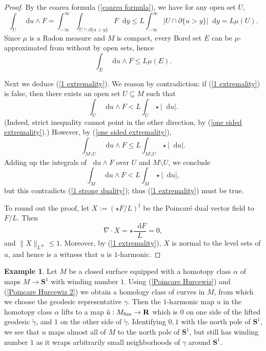 \documentclass[reqno,11pt]{amsart}
\newcommand{\RR}{\mathbf{R}}
\newcommand{\Sph}{\mathbf S}
\newcommand*\dif{\mathop{}\!\mathrm{d}}
\theoremstyle{definition}
\newtheorem{example}[theorem]{Example}
\numberwithin{equation}{section}
\begin{document}
\begin{proof}
By the coarea formula (\ref{coarea formula}), we have for any open set $U$,
$$\int_U \dif u \wedge F = \int_{-\infty}^\infty \int_{U \cap \partial \{u > y\}} F \dif y \leq L \int_{-\infty}^\infty |U \cap \partial \{u > y\}| \dif y = L \mu(U).$$
Since $\mu$ is a Radon measure and $M$ is compact, every Borel set $E$ can be $\mu$-approximated from without by open sets, hence
\begin{equation}\label{one sided extremality}
\int_E \dif u \wedge F \leq L \mu(E).
\end{equation}

Next we deduce (\ref{1 extremality}).
We reason by contradiction: if (\ref{1 extremality}) is false, then there exists an open set $U \subseteq M$ such that 
$$\int_U \dif u \wedge F < L \int_U \star |\dif u|.$$
(Indeed, strict inequality cannot point in the other direction, by (\ref{one sided extremality}).)
However, by (\ref{one sided extremality}), 
$$\int_{M \setminus U} \dif u \wedge F \leq L \int_{M \setminus U} \star |\dif u|.$$
Adding up the integrals of $\dif u \wedge F$ over $U$ and $M \setminus U$, we conclude 
$$\int_M \dif u \wedge F < L \int_M \star |\dif u|,$$
but this contradicts (\ref{1 strong duality}); thus (\ref{1 extremality}) must be true.

To round out the proof, let $X := (\star F/L)^\sharp$ be the Poincar\'e dual vector field to $F/L$. Then
$$\nabla \cdot X = \star \frac{\dif F}{L} = 0,$$
and $\|X\|_{L^\infty} \leq 1$.
Moreover, by (\ref{1 extremality}), $X$ is normal to the level sets of $u$, and hence is a witness that $u$ is $1$-harmonic.
\end{proof}

\begin{example}
Let $M$ be a closed surface equipped with a homotopy class $\alpha$ of maps $M \to \Sph^1$ with winding number $1$.
Using (\ref{Poincare Hurcewiz}) and (\ref{Poincare Hurcewiz 2}) we obtain a homology class of curves in $M$, from which we choose the geodesic representative $\gamma$.
Then the $1$-harmonic map $u$ in the homotopy class $\alpha$ lifts to a map $\tilde u: M_{\rm fun} \to \RR$ which is $0$ on one side of the lifted geodesic $\tilde \gamma$, and $1$ on the other side of $\tilde \gamma$.
Identifying $0, 1$ with the north pole of $\Sph^1$, we see that $u$ maps almost all of $M$ to the north pole of $\Sph^1$, but still has winding number $1$ as it wraps arbitrarily small neighborhoods of $\gamma$ around $\Sph^1$.
\end{example}
\end{document}
